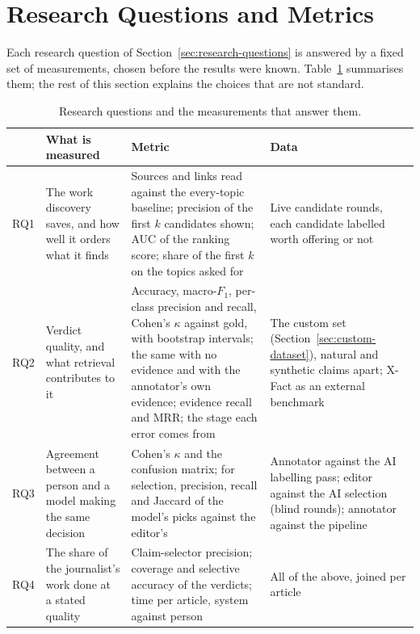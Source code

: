 

\section{Research Questions and Metrics}
\label{sec:rq-metrics}

Each research question of Section~\ref{sec:research-questions} is
answered by a fixed set of measurements, chosen before the results
were known. Table~\ref{tab:rq-metrics} summarises them; the rest of
this section explains the choices that are not standard.

\begin{table}[ht]
\centering
\small
\begin{tabularx}{\linewidth}{@{}lXXX@{}}
\toprule
& \textbf{What is measured} & \textbf{Metric} & \textbf{Data} \\
\midrule
RQ1 & The work discovery saves, and how well it orders what it
finds & Sources and links read against the every-topic baseline;
precision of the first $k$ candidates shown; AUC of the ranking
score; share of the first $k$ on the topics asked for & Live
candidate rounds, each candidate labelled worth offering or not \\
\addlinespace
RQ2 & Verdict quality, and what retrieval contributes to it &
Accuracy, macro-$F_1$, per-class precision and recall, Cohen's
$\kappa$ against gold, with bootstrap intervals; the same with no
evidence and with the annotator's own evidence; evidence recall and
MRR; the stage each error comes from & The custom set
(Section~\ref{sec:custom-dataset}), natural and synthetic claims
apart; X-Fact as an external benchmark \\
\addlinespace
RQ3 & Agreement between a person and a model making the same
decision & Cohen's $\kappa$ and the confusion matrix; for selection,
precision, recall and Jaccard of the model's picks against the
editor's & Annotator against the AI labelling pass; editor against
the AI selection (blind rounds); annotator against the pipeline \\
\addlinespace
RQ4 & The share of the journalist's work done at a stated quality &
Claim-selector precision; coverage and selective accuracy of the
verdicts; time per article, system against person & All of the
above, joined per article \\
\bottomrule
\end{tabularx}
\caption{Research questions and the measurements that answer them.}
\label{tab:rq-metrics}
\end{table}

